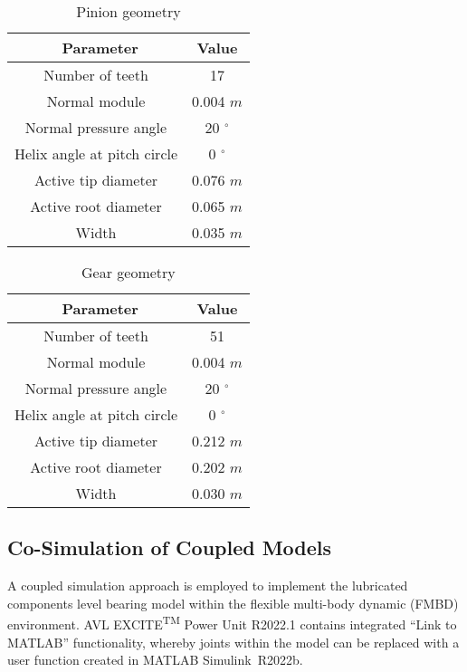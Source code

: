 \begin{table*}
	\caption{Pinion geometry}
	\label{Pinion Geometry}
	\centering
	\renewcommand{\arraystretch}{1.5}%
	\begin{tabular}{|c|c|}
		\hline
		\ \textbf{Parameter} & \textbf{Value} \\ [0.5ex]
		\hline
		Number of teeth & 17 \\ [0.5ex]
		\hline
		Normal module & 0.004 $m$ \\ [0.5ex]
		\hline
		Normal pressure angle & 20 $^{\circ}$ \\ [0.5ex]
		\hline
		Helix angle at pitch circle & 0 $^{\circ}$ \\ [0.5ex]
		\hline
		Active tip diameter & 0.076 $m$ \\ [0.5ex]
		\hline
		Active root diameter & 0.065 $m$ \\ [0.5ex]
		\hline
		Width & 0.035 $m$ \\ [0.5ex]
		\hline
	\end{tabular}
\end{table*}

\begin{table*}
	\caption{Gear geometry}
	\label{Gear Geometry}
	\centering
	\renewcommand{\arraystretch}{1.5}%
	\begin{tabular}{|c|c|}
		\hline
		\ \textbf{Parameter} & \textbf{Value} \\ [0.5ex]
		\hline
		Number of teeth & 51 \\ [0.5ex]
		\hline
		Normal module & 0.004 $m$ \\ [0.5ex]
		\hline
		Normal pressure angle & 20 $^{\circ}$ \\ [0.5ex]
		\hline
		Helix angle at pitch circle & 0 $^{\circ}$ \\ [0.5ex]
		\hline
		Active tip diameter & 0.212 $m$ \\ [0.5ex]
		\hline
		Active root diameter & 0.202 $m$ \\ [0.5ex]
		\hline
		Width & 0.030 $m$ \\ [0.5ex]
		\hline
	\end{tabular}
\end{table*}

\subsection{Co-Simulation of Coupled Models}
A coupled simulation approach is employed to implement the lubricated components level bearing model within the flexible multi-body dynamic (FMBD) environment. AVL EXCITE\textsuperscript{TM} Power Unit R2022.1 contains integrated “Link to MATLAB” functionality, whereby joints within the model can be replaced with a user function created in MATLAB Simulink\textregistered\ R2022b.

